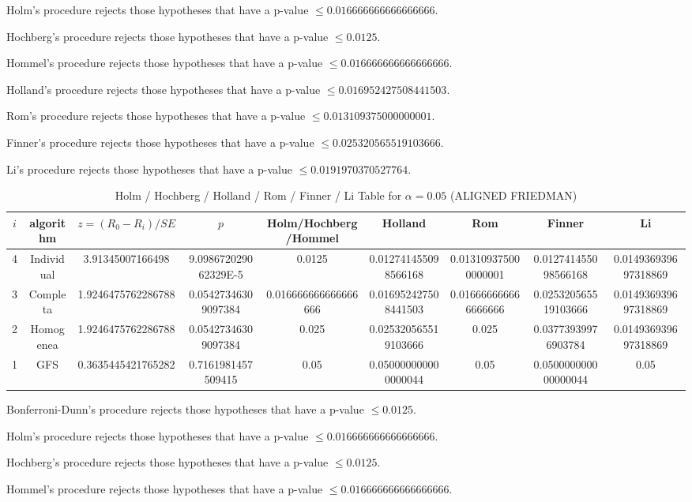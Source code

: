 \documentclass[a4paper,10pt]{article}
\begin{document}
\begin{landscape}
Holm's procedure rejects those hypotheses that have a p-value $\le0.016666666666666666$.


Hochberg's procedure rejects those hypotheses that have a p-value $\le0.0125$.


Hommel's procedure rejects those hypotheses that have a p-value $\le0.016666666666666666$.


Holland's procedure rejects those hypotheses that have a p-value $\le0.016952427508441503$.


Rom's procedure rejects those hypotheses that have a p-value $\le0.013109375000000001$.


Finner's procedure rejects those hypotheses that have a p-value $\le0.025320565519103666$.


Li's procedure rejects those hypotheses that have a p-value $\le0.0191970370527764$.



\newpage

\begin{table}[!htp]
\centering\scriptsize
\caption{Holm / Hochberg / Holland / Rom / Finner / Li Table for $\alpha=0.05$ (ALIGNED FRIEDMAN)}
\begin{tabular}{ccccccccc}
$i$&algorithm&$z=(R_0 - R_i)/SE$&$p$&Holm/Hochberg/Hommel&Holland&Rom&Finner&Li\\
\hline
4&Individual&3.91345007166498&9.098672029062329E-5&0.0125&0.012741455098566168&0.013109375000000001&0.012741455098566168&0.014936939697318869\\
3&Completa&1.9246475762286788&0.05427346309097384&0.016666666666666666&0.016952427508441503&0.016666666666666666&0.025320565519103666&0.014936939697318869\\
2&Homogenea&1.9246475762286788&0.05427346309097384&0.025&0.025320565519103666&0.025&0.03773939976903784&0.014936939697318869\\
1&GFS&0.3635445421765282&0.7161981457509415&0.05&0.050000000000000044&0.05&0.050000000000000044&0.05\\
\hline
\end{tabular}
\end{table}
Bonferroni-Dunn's procedure rejects those hypotheses that have a p-value $\le0.0125$.


Holm's procedure rejects those hypotheses that have a p-value $\le0.016666666666666666$.


Hochberg's procedure rejects those hypotheses that have a p-value $\le0.0125$.


Hommel's procedure rejects those hypotheses that have a p-value $\le0.016666666666666666$.



\end{landscape}
\end{document}
